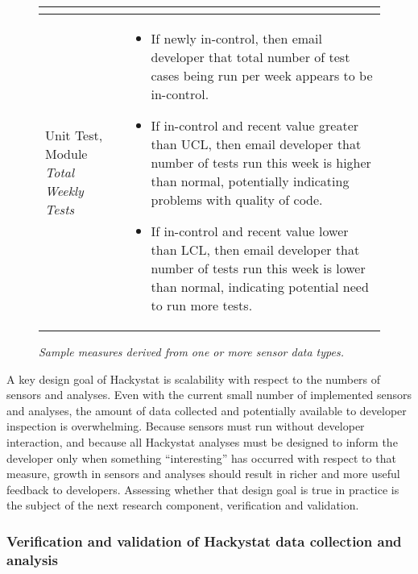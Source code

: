 \begin{figure*}[ht]
\begin{small}
\begin{center}
\begin{tabular}{|p{1.2in}|p{5in}|}
\begin{itemize}
\vspace{-4mm}
\end{itemize}
\\ \hline
Unit Test, \newline
Module \newline
{\em Total Weekly Tests}
& \protect
\begin{itemize}
\vspace{-5mm}\item If newly in-control, then email developer that total number of 
test cases being run per week appears to be in-control.
\vspace{-2mm}\item If in-control and recent value greater than UCL, then
email developer that number of tests run this week is higher than normal, 
potentially indicating problems with quality of code.
\vspace{-2mm}\item If in-control and recent value lower than LCL, then
email developer that number of tests run this week is lower than normal,
indicating potential need to run more tests. 
\vspace{-4mm}
\end{itemize}
\\ \hline
\end{tabular} 
\end{center}
\end{small}
\caption{{\em Sample measures derived from one or more sensor data types. }}
\label{fig:analyses}
\end{figure*}

A key design goal of Hackystat is scalability with respect to the numbers
of sensors and analyses. Even with the current small number of implemented
sensors and analyses, the amount of data collected and potentially
available to developer inspection is overwhelming.  Because sensors must
run without developer interaction, and because all Hackystat analyses must
be designed to inform the developer only when something ``interesting'' has
occurred with respect to that measure, growth in sensors and analyses
should result in richer and more useful feedback to developers.  Assessing
whether that design goal is true in practice is the subject of the next
research component, verification and validation.

\subsubsection{Verification and validation of Hackystat data collection and 
analysis} 

